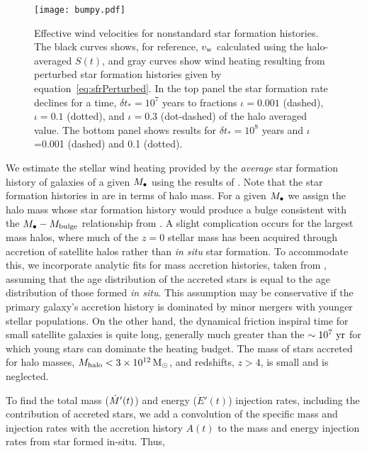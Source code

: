  \begin{figure}
  \texttt{[image: bumpy.pdf]}
  \caption{\label{fig:NickPlot2} Effective wind velocities for
    nonstandard star formation histories.  The black curves shows, for
    reference, $v_{\rm w}$ calculated using the halo-averaged $S(t)$,
    and gray curves show wind heating resulting from perturbed star
    formation histories given by equation~\eqref{eq:sfrPerturbed}. In
    the top panel the star formation rate declines for a time, $\delta
    t_*=10^{7}$ years to fractions $\iota= 0.001$ (dashed), $\iota
    =0.1$ (dotted), and $\iota = 0.3$ (dot-dashed) of the halo
    averaged value. The bottom panel shows results for $\delta
    t_*=10^{8}$ years and $\iota$=0.001 (dashed) and 0.1 (dotted).}
  \end{figure}
  We estimate the stellar wind heating provided by the {\it average}
  star formation history of galaxies of a given $M_{\bullet}$ using the
  results of \citet[eqs.~17-20]{MosterNaab+:2013a}.  Note that the
  star formation histories in \citet{MosterNaab+:2013a} are in terms
  of halo mass. For a given $M_{\bullet}$ we assign the halo mass whose star
  formation history would produce a bulge consistent with the
  $M_{\bullet}-M_{\rm bulge}$ relationship from \citet{McConnellMa:2013a}.  A
  slight complication occurs for the largest mass halos, where much of
  the $z=0$ stellar mass has been acquired through accretion of
  satellite halos rather than {\it in situ} star formation.  To
  accommodate this, we incorporate analytic fits for mass accretion
  histories, taken from \citet[their eqs.~21-23]{MosterNaab+:2013a},
  assuming that the age distribution of the accreted stars is equal to
  the age distribution of those formed {\it in situ}.  This assumption
  may be conservative if the primary galaxy's accretion history is
  dominated by minor mergers with younger stellar populations.  On the
  other hand, the dynamical friction inspiral time for small satellite
  galaxies is quite long, generally much greater than the $\sim
  10^7~{\rm yr}$ for which young stars can dominate the heating
  budget.  The mass of stars accreted for halo masses, $M_{\rm halo}< 3
  \times 10^{12} \,{\rm M_\odot}$, and redshifts, $z>4$, is small and is neglected.

  To find the total mass ($\dot{M}'(t)$) and energy ($\dot{E}'(t)$)
  injection rates, including the contribution of accreted stars, we
  add a convolution of the specific mass and injection rates with the
  accretion history $A(t)$ to the mass and energy injection rates from
  star formed in-situ.  Thus,

